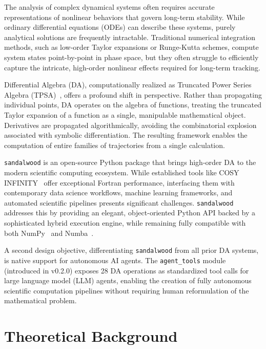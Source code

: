 \documentclass[aps,prb,reprint,superscriptaddress,nofootinbib]{revtex4-2}
\begin{document}
The analysis of complex dynamical systems often requires accurate representations of nonlinear behaviors that govern long-term stability. While ordinary differential equations (ODEs) can describe these systems, purely analytical solutions are frequently intractable. Traditional numerical integration methods, such as low-order Taylor expansions or Runge-Kutta schemes, compute system states point-by-point in phase space, but they often struggle to efficiently capture the intricate, high-order nonlinear effects required for long-term tracking.

Differential Algebra (DA), computationally realized as Truncated Power Series Algebra (TPSA)~\cite{berz1999differential}, offers a profound shift in perspective. Rather than propagating individual points, DA operates on the algebra of functions, treating the truncated Taylor expansion of a function as a single, manipulable mathematical object. Derivatives are propagated algorithmically, avoiding the combinatorial explosion associated with symbolic differentiation. The resulting framework enables the computation of entire families of trajectories from a single calculation.

\texttt{sandalwood} is an open-source Python package that brings high-order DA to the modern scientific computing ecosystem. While established tools like COSY INFINITY~\cite{berz1989cosy, makino2006cosy} offer exceptional Fortran performance, interfacing them with contemporary data science workflows, machine learning frameworks, and automated scientific pipelines presents significant challenges. \texttt{sandalwood} addresses this by providing an elegant, object-oriented Python API backed by a sophisticated hybrid execution engine, while remaining fully compatible with both NumPy~\cite{harris2020numpy} and Numba~\cite{lam2015numba}.

A second design objective, differentiating \texttt{sandalwood} from all prior DA systems, is native support for autonomous AI agents. The \texttt{agent\_tools} module (introduced in v0.2.0) exposes 28 DA operations as standardized tool calls for large language model (LLM) agents, enabling the creation of fully autonomous scientific computation pipelines without requiring human reformulation of the mathematical problem.

\section{Theoretical Background}
\label{sec:theory}
\end{document}
